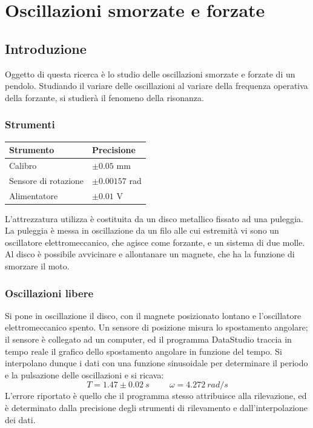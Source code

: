 
\chapter{Oscillazioni smorzate e forzate}


\section{Introduzione}

Oggetto di questa ricerca è lo studio delle oscillazioni smorzate e forzate di un pendolo. Studiando il variare delle oscillazioni al variare della frequenza operativa della forzante, si studierà il fenomeno della risonanza.

\subsection{Strumenti}
\begin{center}
\begin{tabular}{l|l}
\midrule
Strumento & Precisione\\
\midrule
Calibro & $\pm 0.05$ mm\\ 
Sensore di rotazione & $\pm 0.00157$ rad\\ 
Alimentatore & $\pm 0.01$ V\\ 
\midrule 
\end{tabular}
\end{center}
L'attrezzatura utilizza è costituita da un disco metallico fissato ad una puleggia. La puleggia è messa in oscillazione da un filo alle cui estremità vi sono un oscillatore  elettromeccanico, che agisce come forzante, e un sistema di due molle. Al disco è possibile avvicinare e allontanare un magnete, che ha la funzione di smorzare il moto.

\subsection{Oscillazioni libere}

Si pone in oscillazione il disco, con il magnete  posizionato lontano e l'oscillatore elettromeccanico spento. Un sensore di posizione misura lo spostamento angolare; il sensore è collegato ad un computer, ed il programma DataStudio traccia in tempo reale il grafico dello spostamento angolare in funzione del tempo. Si interpolano dunque i dati con una funzione sinusoidale per determinare il periodo e la pulsazione delle oscillazioni e si ricava: $$T=1.47\pm0.02\ s \hspace{1cm} \omega=4.272\ rad/s$$ L'errore riportato è quello che il programma stesso attribuisce alla rilevazione, ed è determinato dalla precisione degli strumenti di rilevamento e dall'interpolazione dei dati.

